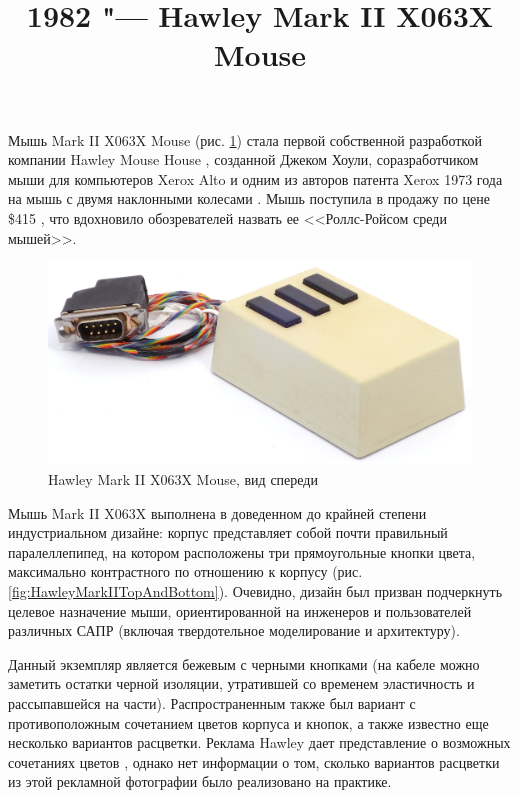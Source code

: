 \documentclass[11pt, a4paper]{article}
\begin{document}
\title{1982 "--- Hawley Mark II X063X Mouse}
\date{}
\maketitle
{}
Мышь Mark II X063X Mouse (рис. \ref{fig:HawleyMarkIIPic}) стала первой собственной разработкой компании Hawley Mouse House \cite{hawley,mouses}, созданной Джеком Хоули, соразработчиком мыши для компьютеров Xerox Alto и одним из авторов патента Xerox 1973 года на мышь с двумя наклонными колесами \cite{pat}. Мышь поступила в продажу по цене \$415 \cite{buxton}, что вдохновило обозревателей назвать ее <<Роллс-Ройсом среди мышей>>.

\begin{figure}[h]
   \centering
    \includegraphics[scale=0.6]{1983_hawley_mark_ii/pic_60.jpg}
    \caption{Hawley Mark II X063X Mouse, вид спереди}
    \label{fig:HawleyMarkIIPic}
\end{figure}

Мышь Mark II X063X выполнена в доведенном до крайней степени индустриальном дизайне: корпус представляет собой почти правильный паралеллепипед, на котором расположены три прямоугольные кнопки цвета, максимально контрастного по отношению к корпусу (рис. \ref{fig:HawleyMarkIITopAndBottom}). Очевидно, дизайн был призван подчеркнуть целевое назначение мыши, ориентированной на инженеров и пользователей различных САПР (включая твердотельное моделирование и архитектуру).

Данный экземпляр является бежевым с черными кнопками (на кабеле можно заметить остатки черной изоляции, утратившей со временем эластичность и рассыпавшейся на части). Распространенным также был вариант с противоположным сочетанием цветов корпуса и кнопок, а также известно еще несколько вариантов расцветки. Реклама Hawley дает представление о возможных сочетаниях цветов \cite{brochure}, однако нет информации о том, сколько вариантов расцветки из этой рекламной фотографии было реализовано на практике.
\end{document}
